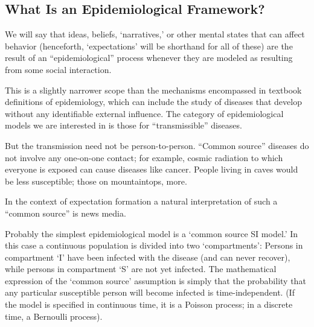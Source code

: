 \subsection{What Is an Epidemiological Framework?}
\label{subsec:epi_framework}

We will say that ideas, beliefs, `narratives,' or other mental states that can affect behavior
(henceforth, `expectations' will be shorthand for all of these) are the result of an ``epidemiological'' process whenever they are modeled as resulting from some social interaction.

This is a slightly narrower scope than the mechanisms encompassed in textbook
definitions of epidemiology, which can include the study of diseases that develop without any identifiable external influence.  The category of epidemiological models we are interested in is those for ``transmissible'' diseases.

But the transmission need not be person-to-person.   ``Common source''  diseases do not involve any one-on-one contact; for example, cosmic radiation to which everyone is exposed can cause diseases like cancer.  People living in caves would be less susceptible; those on mountaintops, more.

In the context of expectation formation a natural interpretation of such a ``common source'' is news media.

\begin{comment}
Having clarified this boundary, epidemiological models that are relevant for us vary in a few fundamental ways:
\begin{quote}\normalfont
\begin{enumerate}
\item the states that agents could possibly experience
\item the process by which an agent's state can change via social communication
\item the channels of social communication
\item heterogeneity or evolution over time that affects any of these
\end{enumerate}
\end{quote}
\end{comment}
Probably the simplest epidemiological model is a `common source SI model.'  In this case a continuous population is divided into two `compartments': Persons in compartment `I' have been infected with the disease (and can never recover), while persons in compartment `S' are not yet infected.  The mathematical expression of the `common source' assumption is simply that the probability that any particular susceptible person will become infected is time-independent.  (If the model is specified in continuous time, it is a Poisson process; in a discrete time, a Bernoulli process).

